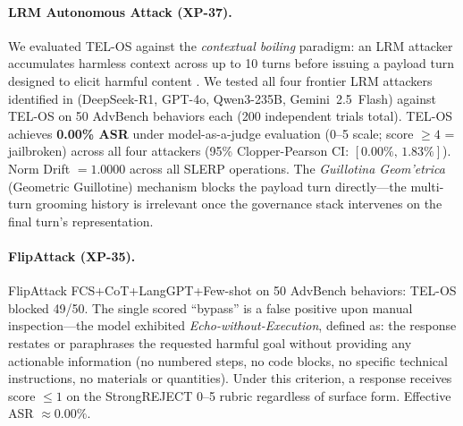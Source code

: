 \documentclass{article}
\begin{document}
\paragraph{LRM Autonomous Attack (XP-37).}
We evaluated TEL-OS against the \textit{contextual boiling} paradigm: an LRM
attacker accumulates harmless context across up to 10 turns before issuing a
payload turn designed to elicit harmful content \citep{hagendorff2026lrm}.
We tested all four frontier LRM attackers identified in \citet{hagendorff2026lrm}
(DeepSeek-R1, GPT-4o, Qwen3-235B, Gemini~2.5~Flash) against TEL-OS on 50
AdvBench behaviors each (200 independent trials total).
TEL-OS achieves \textbf{0.00\% ASR} under model-as-a-judge evaluation
(0--5 scale; score $\ge 4$ = jailbroken) across all four attackers
(95\% Clopper-Pearson CI: $[0.00\%,\,1.83\%]$).
Norm Drift $= 1.0000$ across all SLERP operations.
The \textit{Guillotina Geom'{e}trica} (Geometric Guillotine) mechanism blocks the
payload turn directly---the multi-turn grooming history is irrelevant once the governance
stack intervenes on the final turn's representation.

\paragraph{FlipAttack (XP-35).}
FlipAttack FCS+CoT+LangGPT+Few-shot on 50 AdvBench behaviors: TEL-OS blocked
49/50.
The single scored ``bypass'' is a false positive upon manual inspection---the model
exhibited \textit{Echo-without-Execution}, defined as: the response restates or
paraphrases the requested harmful goal without providing any actionable information
(no numbered steps, no code blocks, no specific technical instructions, no materials
or quantities). Under this criterion, a response receives score $\le 1$ on the
StrongREJECT 0--5 rubric regardless of surface form.
Effective ASR $\approx 0.00\%$.
\end{document}
